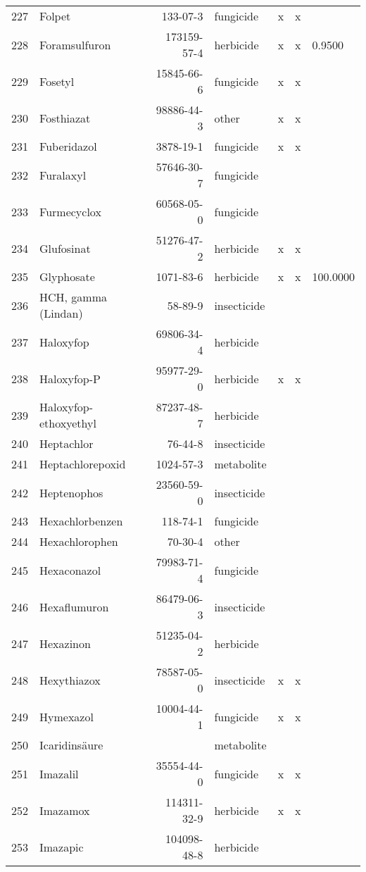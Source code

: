 \begin{longtable}{lp{4cm}rlp{1.3cm}p{1.3cm}p{1.5cm}}
  227 & Folpet & 133-07-3 & fungicide & x & x &  \\ 
  228 & Foramsulfuron & 173159-57-4 & herbicide & x & x & 0.9500 \\ 
  229 & Fosetyl & 15845-66-6 & fungicide & x & x &  \\ 
  230 & Fosthiazat & 98886-44-3 & other & x & x &  \\ 
  231 & Fuberidazol & 3878-19-1 & fungicide & x & x &  \\ 
  232 & Furalaxyl & 57646-30-7 & fungicide &  &  &  \\ 
  233 & Furmecyclox & 60568-05-0 & fungicide &  &  &  \\ 
  234 & Glufosinat & 51276-47-2 & herbicide & x & x &  \\ 
  235 & Glyphosate & 1071-83-6 & herbicide & x & x & 100.0000 \\ 
  236 & HCH, gamma (Lindan) & 58-89-9 & insecticide &  &  &  \\ 
  237 & Haloxyfop & 69806-34-4 & herbicide &  &  &  \\ 
  238 & Haloxyfop-P & 95977-29-0 & herbicide & x & x &  \\ 
  239 & Haloxyfop-ethoxyethyl & 87237-48-7 & herbicide &  &  &  \\ 
  240 & Heptachlor & 76-44-8 & insecticide &  &  &  \\ 
  241 & Heptachlorepoxid & 1024-57-3 & metabolite &  &  &  \\ 
  242 & Heptenophos & 23560-59-0 & insecticide &  &  &  \\ 
  243 & Hexachlorbenzen & 118-74-1 & fungicide &  &  &  \\ 
  244 & Hexachlorophen & 70-30-4 & other &  &  &  \\ 
  245 & Hexaconazol & 79983-71-4 & fungicide &  &  &  \\ 
  246 & Hexaflumuron & 86479-06-3 & insecticide &  &  &  \\ 
  247 & Hexazinon & 51235-04-2 & herbicide &  &  &  \\ 
  248 & Hexythiazox & 78587-05-0 & insecticide & x & x &  \\ 
  249 & Hymexazol & 10004-44-1 & fungicide & x & x &  \\ 
  250 & Icaridinsäure &  & metabolite &  &  &  \\ 
  251 & Imazalil & 35554-44-0 & fungicide & x & x &  \\ 
  252 & Imazamox & 114311-32-9 & herbicide & x & x &  \\ 
  253 & Imazapic & 104098-48-8 & herbicide &  &  &  \\ 

\end{longtable}
